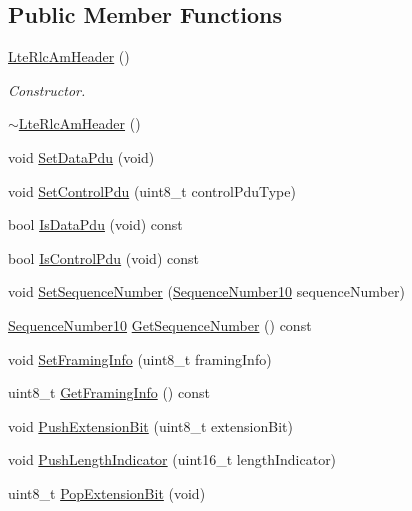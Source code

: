 \subsection*{Public Member Functions}
\begin{DoxyCompactItemize}
\item 
\hyperlink{classns3_1_1LteRlcAmHeader_a5c4f8ac2cf2a00d87628286a3a5f5262}{Lte\+Rlc\+Am\+Header} ()
\begin{DoxyCompactList}\small\item\em Constructor. \end{DoxyCompactList}\item 
\hyperlink{classns3_1_1LteRlcAmHeader_a87e881eb3869b50ca378462289604389}{$\sim$\+Lte\+Rlc\+Am\+Header} ()
\item 
void \hyperlink{classns3_1_1LteRlcAmHeader_a67aaf50fd94c1e90d1a911a060a47def}{Set\+Data\+Pdu} (void)
\item 
void \hyperlink{classns3_1_1LteRlcAmHeader_af3503011ebf7fac9ea538868770c8b4b}{Set\+Control\+Pdu} (uint8\+\_\+t control\+Pdu\+Type)
\item 
bool \hyperlink{classns3_1_1LteRlcAmHeader_aa5a97fabaa26159833829913e547eaef}{Is\+Data\+Pdu} (void) const 
\item 
bool \hyperlink{classns3_1_1LteRlcAmHeader_ad53799bfc311defab4b5aaced3a0b2f0}{Is\+Control\+Pdu} (void) const 
\item 
void \hyperlink{classns3_1_1LteRlcAmHeader_af9cc3b25e5dbbb2f6e06e5241b7e8e27}{Set\+Sequence\+Number} (\hyperlink{classns3_1_1SequenceNumber10}{Sequence\+Number10} sequence\+Number)
\item 
\hyperlink{classns3_1_1SequenceNumber10}{Sequence\+Number10} \hyperlink{classns3_1_1LteRlcAmHeader_a914d9077af32c2a1e648866c82097bb0}{Get\+Sequence\+Number} () const 
\item 
void \hyperlink{classns3_1_1LteRlcAmHeader_a77aa5626dde3fcd443c70b29bbe61f5b}{Set\+Framing\+Info} (uint8\+\_\+t framing\+Info)
\item 
uint8\+\_\+t \hyperlink{classns3_1_1LteRlcAmHeader_ab0dfb5284d765281c08cb2f1de18c4eb}{Get\+Framing\+Info} () const 
\item 
void \hyperlink{classns3_1_1LteRlcAmHeader_a1f8cfc71f00f8cdf1159e56ad43b7553}{Push\+Extension\+Bit} (uint8\+\_\+t extension\+Bit)
\item 
void \hyperlink{classns3_1_1LteRlcAmHeader_ad00dd2f3b09738c130ccb7d28616e2cb}{Push\+Length\+Indicator} (uint16\+\_\+t length\+Indicator)
\item 
uint8\+\_\+t \hyperlink{classns3_1_1LteRlcAmHeader_a5ad09a55d3093709e521021266752412}{Pop\+Extension\+Bit} (void)

\end{DoxyCompactItemize}
